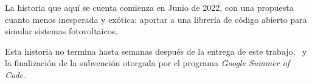 \newpage

La historia que aquí se cuenta comienza en Junio de 2022, con una propuesta cuanto menos inesperada y exótica: aportar a una librería de código abierto para simular sistemas fotovoltaicos.

Esta historia no termina hasta semanas después de la entrega de este trabajo, \FechaLectura\ y la finalización de la subvención otorgada por el programa \textit{Google Summer of Code}.

\newpage
